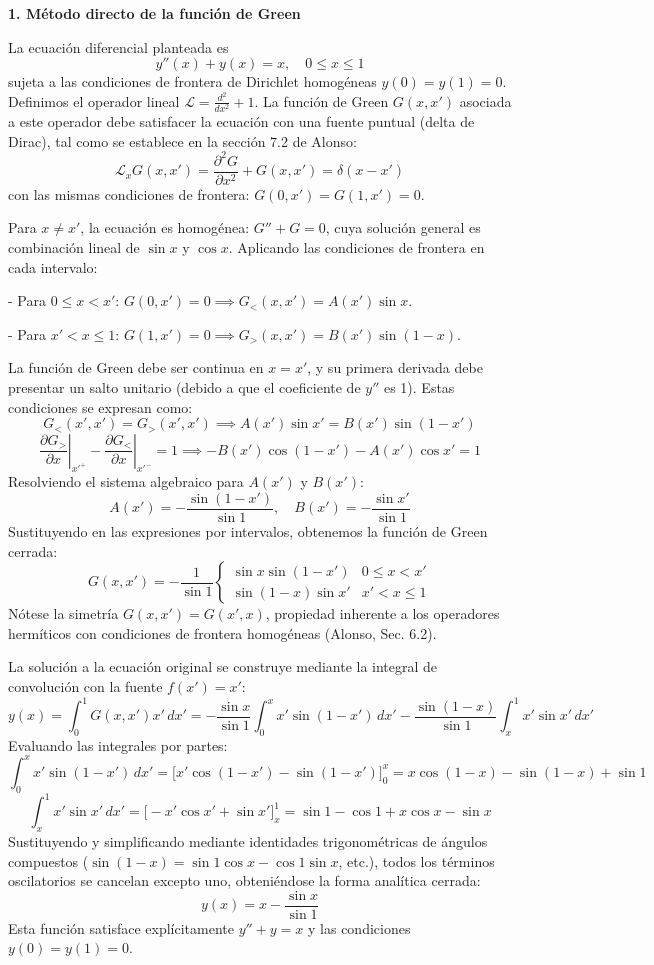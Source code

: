 \documentclass[a4paper]{article}
\begin{document}
\textbf{1. Método directo de la función de Green}

La ecuación diferencial planteada es
$$ y''(x) + y(x) = x, \quad 0 \le x \le 1 $$
sujeta a las condiciones de frontera de Dirichlet homogéneas $y(0) = y(1) = 0$. Definimos el operador lineal $\mathscr{L} = \frac{d^2}{dx^2} + 1$. La función de Green $G(x, x')$ asociada a este operador debe satisfacer la ecuación con una fuente puntual (delta de Dirac), tal como se establece en la sección 7.2 de Alonso:
$$ \mathscr{L}_x G(x, x') = \frac{\partial^2 G}{\partial x^2} + G(x, x') = \delta(x - x') $$
con las mismas condiciones de frontera: $G(0, x') = G(1, x') = 0$. 

Para $x \neq x'$, la ecuación es homogénea: $G'' + G = 0$, cuya solución general es combinación lineal de $\sin x$ y $\cos x$. Aplicando las condiciones de frontera en cada intervalo:

- Para $0 \le x < x'$: $G(0, x') = 0 \implies G_<(x, x') = A(x') \sin x$.

- Para $x' < x \le 1$: $G(1, x') = 0 \implies G_>(x, x') = B(x') \sin(1 - x)$.

La función de Green debe ser continua en $x = x'$, y su primera derivada debe presentar un salto unitario (debido a que el coeficiente de $y''$ es 1). Estas condiciones se expresan como:
$$ G_<(x', x') = G_>(x', x') \implies A(x') \sin x' = B(x') \sin(1 - x') $$
$$ \left. \frac{\partial G_>}{\partial x} \right|_{x'^+} - \left. \frac{\partial G_<}{\partial x} \right|_{x'^-} = 1 \implies -B(x') \cos(1 - x') - A(x') \cos x' = 1 $$
Resolviendo el sistema algebraico para $A(x')$ y $B(x')$:
$$ A(x') = -\frac{\sin(1 - x')}{\sin 1}, \quad B(x') = -\frac{\sin x'}{\sin 1} $$
Sustituyendo en las expresiones por intervalos, obtenemos la función de Green cerrada:
$$ G(x, x') = -\frac{1}{\sin 1} \begin{cases} \sin x \sin(1 - x') & 0 \le x < x' \\ \sin(1 - x) \sin x' & x' < x \le 1 \end{cases} $$
Nótese la simetría $G(x, x') = G(x', x)$, propiedad inherente a los operadores hermíticos con condiciones de frontera homogéneas (Alonso, Sec. 6.2).

La solución a la ecuación original se construye mediante la integral de convolución con la fuente $f(x') = x'$:
$$ y(x) = \int_0^1 G(x, x') x' \, dx' = -\frac{\sin x}{\sin 1} \int_0^x x' \sin(1 - x') \, dx' - \frac{\sin(1 - x)}{\sin 1} \int_x^1 x' \sin x' \, dx' $$
Evaluando las integrales por partes:
$$ \int_0^x x' \sin(1 - x') \, dx' = \big[ x' \cos(1 - x') - \sin(1 - x') \big]_0^x = x \cos(1 - x) - \sin(1 - x) + \sin 1 $$
$$ \int_x^1 x' \sin x' \, dx' = \big[ -x' \cos x' + \sin x' \big]_x^1 = \sin 1 - \cos 1 + x \cos x - \sin x $$
Sustituyendo y simplificando mediante identidades trigonométricas de ángulos compuestos ($\sin(1-x) = \sin 1 \cos x - \cos 1 \sin x$, etc.), todos los términos oscilatorios se cancelan excepto uno, obteniéndose la forma analítica cerrada:
$$ y(x) = x - \frac{\sin x}{\sin 1} $$
Esta función satisface explícitamente $y'' + y = x$ y las condiciones $y(0) = y(1) = 0$.
\end{document}
